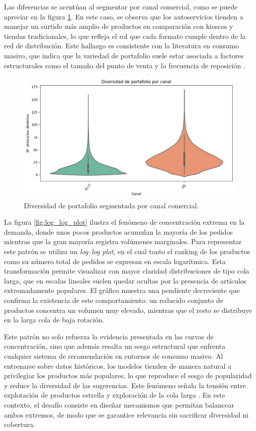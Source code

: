 Las diferencias se acentúan al segmentar por canal comercial, como se puede apreciar en la figura \ref{fig:boxplot_diversidad}. En este caso, se observa que los autoservicios tienden a manejar un surtido más amplio de productos en comparación con kioscos y tiendas tradicionales, lo que refleja el rol que cada formato cumple dentro de la red de distribución. Este hallazgo es consistente con la literatura en consumo masivo, que indica que la variedad de portafolio suele estar asociada a factores estructurales como el tamaño del punto de venta y la frecuencia de reposición \cite{BOOK:Kotler2017}.

\begin{figure}[htpb]
	\centering
	\includegraphics[scale=.6]{./Figures/boxplot_diversidad_canal.png}
	\caption{Diversidad de portafolio segmentada por canal comercial.}
	\label{fig:boxplot_diversidad}
\end{figure}

La figura \ref{fig:log_log_plot} ilustra el fenómeno de concentración extrema en la demanda, donde unos pocos productos acumulan la mayoría de los pedidos mientras que la gran mayoría registra volúmenes marginales. Para representar este patrón se utiliza un \textit{log–log plot}, en el cual tanto el ranking de los productos como su número total de pedidos se expresan en escala logarítmica. Esta transformación permite visualizar con mayor claridad distribuciones de tipo cola larga, que en escalas lineales suelen quedar ocultas por la presencia de artículos extremadamente populares. El gráfico muestra una pendiente decreciente que confirma la existencia de este comportamiento: un reducido conjunto de productos concentra un volumen muy elevado, mientras que el resto se distribuye en la larga cola de baja rotación.

Este patrón no solo refuerza la evidencia presentada en las curvas de concentración, sino que además resalta un sesgo estructural que enfrenta cualquier sistema de recomendación en entornos de consumo masivo. Al entrenarse sobre datos históricos, los modelos tienden de manera natural a privilegiar los productos más populares, lo que reproduce el sesgo de popularidad y reduce la diversidad de las sugerencias. Este fenómeno señala la tensión entre explotación de productos estrella y exploración de la cola larga \cite{BOOK:Celma2010}. En este contexto, el desafío consiste en diseñar mecanismos que permitan balancear ambos extremos, de modo que se garantice relevancia sin sacrificar diversidad ni cobertura.


